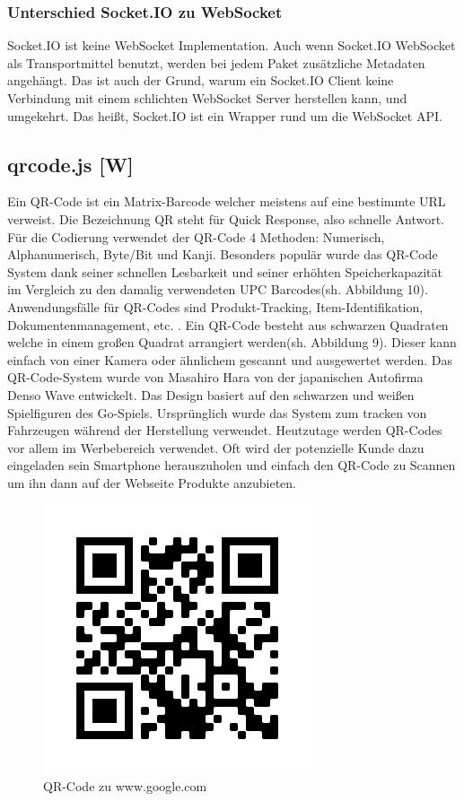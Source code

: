 \subsubsection{Unterschied Socket.IO zu WebSocket}
Socket.IO ist keine WebSocket Implementation. Auch wenn Socket.IO WebSocket als Transportmittel benutzt, werden bei jedem Paket zusätzliche Metadaten angehängt. Das ist auch der Grund, warum
ein Socket.IO Client keine Verbindung mit einem schlichten WebSocket Server herstellen kann, und umgekehrt.
Das heißt, Socket.IO ist ein Wrapper rund um die WebSocket API. \cite{socketio}


\subsection{qrcode.js [W]}
Ein QR-Code ist ein Matrix-Barcode welcher meistens auf eine bestimmte URL verweist. Die Bezeichnung QR steht für Quick Response,
also schnelle Antwort. Für die Codierung verwendet der QR-Code 4 Methoden: Numerisch, Alphanumerisch, Byte/Bit und Kanji.
Besonders populär wurde das QR-Code System dank seiner
schnellen Lesbarkeit und seiner erhöhten Speicherkapazität im Vergleich zu den
damalig verwendeten UPC Barcodes(sh. Abbildung 10). Anwendungsfälle für QR-Codes sind Produkt-Tracking, Item-Identifikation, Dokumentenmanagement, etc. .
Ein QR-Code besteht aus schwarzen Quadraten welche in einem großen Quadrat arrangiert werden(sh. Abbildung 9).
Dieser kann einfach von einer Kamera oder ähnlichem gescannt und ausgewertet werden.
Das QR-Code-System wurde von Masahiro Hara von der japanischen Autofirma Denso Wave entwickelt.
Das Design basiert auf den schwarzen und weißen Spielfiguren des Go-Spiels.
Ursprünglich wurde das System zum tracken von Fahrzeugen während der Herstellung verwendet.
Heutzutage werden QR-Codes vor allem im Werbebereich verwendet. Oft wird der
potenzielle Kunde dazu eingeladen  sein Smartphone herauszuholen und einfach den QR-Code zu Scannen um
ihn dann auf der Webseite Produkte anzubieten.

\begin{figure}[H]
    \centering
    \includegraphics[scale=1]{pics/googleQR.png}
    \caption{QR-Code zu www.google.com}
\end{figure}

